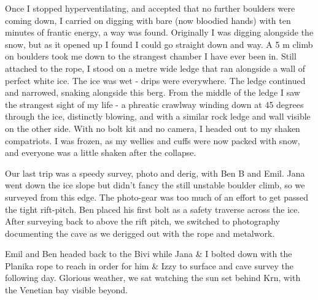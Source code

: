 Once I stopped hyperventilating, and accepted that no further boulders
were coming down, I carried on digging with bare (now bloodied hands)
with ten minutes of frantic energy, a way was found. Originally I was
digging alongside the snow, but as it opened up I found I could go
straight down and way. A 5 m climb on boulders took me down to the
strangest chamber I have ever been in. Still attached to the rope, I
stood on a metre wide ledge that ran alongside a wall of perfect white
ice. The ice was wet - drips were everywhere. The ledge continued and
narrowed, snaking alongside this berg. From the middle of the ledge I
saw the strangest sight of my life - a phreatic crawlway winding down at
45 degrees through the ice, distinctly blowing, and with a similar rock
ledge and wall visible on the other side. With no bolt kit and no
camera, I headed out to my shaken compatriots. I was frozen, as my
wellies and cuffs were now packed with snow, and everyone was a little
shaken after the collapse.


Our last trip was a speedy survey, photo and derig, with Ben B and Emil.
Jana went down the ice slope but didn't fancy the still unstable boulder
climb, so we surveyed from this edge. The photo-gear was too much of an
effort to get passed the tight rift-pitch. Ben placed his first bolt as
a safety traverse across the ice. After surveying back to above the rift
pitch, we switched to photography documenting the cave as we derigged
out with the rope and metalwork.

Emil and Ben headed back to the Bivi while Jana \& I bolted down with
the Planika rope to reach  in order for him \& Izzy to surface
and cave survey the following day. Glorious weather, we sat watching the
sun set behind Krn, with the Venetian bay visible beyond.

